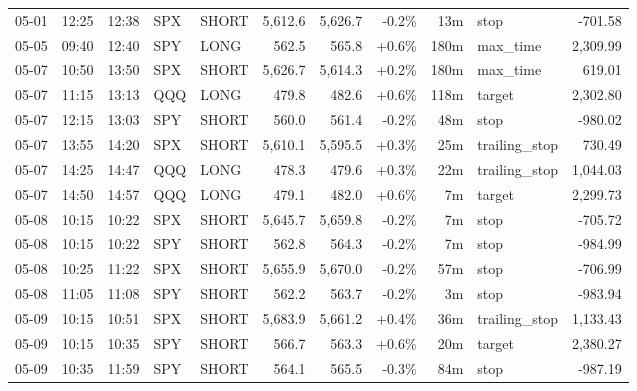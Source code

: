\documentclass[11pt,a4paper,twoside]{article}
\begin{document}
\begin{center}
\begin{longtable}{>{\color{txtmain}}l l l l l r r r r >{\color{txtmain}}l r}
05-01 & 12:25 & 12:38 & SPX & SHORT & 5,612.6 & 5,626.7 & \textcolor{lossred}{-0.2\%} & 13m & stop & \textcolor{lossred}{-701.58} \\
05-05 & 09:40 & 12:40 & SPY & LONG & 562.5 & 565.8 & \textcolor{wingreen}{+0.6\%} & 180m & max\_time & \textcolor{wingreen}{2,309.99} \\
05-07 & 10:50 & 13:50 & SPX & SHORT & 5,626.7 & 5,614.3 & \textcolor{wingreen}{+0.2\%} & 180m & max\_time & \textcolor{wingreen}{619.01} \\
05-07 & 11:15 & 13:13 & QQQ & LONG & 479.8 & 482.6 & \textcolor{wingreen}{+0.6\%} & 118m & target & \textcolor{wingreen}{2,302.80} \\
05-07 & 12:15 & 13:03 & SPY & SHORT & 560.0 & 561.4 & \textcolor{lossred}{-0.2\%} & 48m & stop & \textcolor{lossred}{-980.02} \\
05-07 & 13:55 & 14:20 & SPX & SHORT & 5,610.1 & 5,595.5 & \textcolor{wingreen}{+0.3\%} & 25m & trailing\_stop & \textcolor{wingreen}{730.49} \\
05-07 & 14:25 & 14:47 & QQQ & LONG & 478.3 & 479.6 & \textcolor{wingreen}{+0.3\%} & 22m & trailing\_stop & \textcolor{wingreen}{1,044.03} \\
05-07 & 14:50 & 14:57 & QQQ & LONG & 479.1 & 482.0 & \textcolor{wingreen}{+0.6\%} & 7m & target & \textcolor{wingreen}{2,299.73} \\
05-08 & 10:15 & 10:22 & SPX & SHORT & 5,645.7 & 5,659.8 & \textcolor{lossred}{-0.2\%} & 7m & stop & \textcolor{lossred}{-705.72} \\
05-08 & 10:15 & 10:22 & SPY & SHORT & 562.8 & 564.3 & \textcolor{lossred}{-0.2\%} & 7m & stop & \textcolor{lossred}{-984.99} \\
05-08 & 10:25 & 11:22 & SPX & SHORT & 5,655.9 & 5,670.0 & \textcolor{lossred}{-0.2\%} & 57m & stop & \textcolor{lossred}{-706.99} \\
05-08 & 11:05 & 11:08 & SPY & SHORT & 562.2 & 563.7 & \textcolor{lossred}{-0.2\%} & 3m & stop & \textcolor{lossred}{-983.94} \\
05-09 & 10:15 & 10:51 & SPX & SHORT & 5,683.9 & 5,661.2 & \textcolor{wingreen}{+0.4\%} & 36m & trailing\_stop & \textcolor{wingreen}{1,133.43} \\
05-09 & 10:15 & 10:35 & SPY & SHORT & 566.7 & 563.3 & \textcolor{wingreen}{+0.6\%} & 20m & target & \textcolor{wingreen}{2,380.27} \\
05-09 & 10:35 & 11:59 & SPY & SHORT & 564.1 & 565.5 & \textcolor{lossred}{-0.3\%} & 84m & stop & \textcolor{lossred}{-987.19} \\

\end{longtable}
\end{center}
\end{document}
